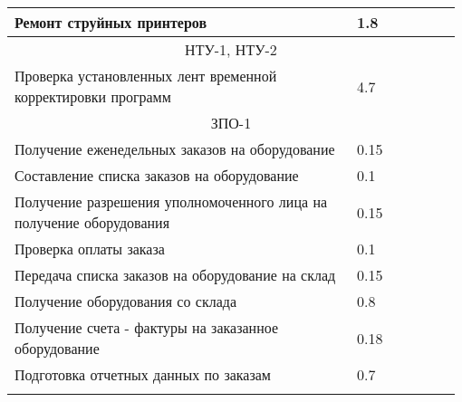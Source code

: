 \documentclass[a4paper,14pt]{extarticle}
\begin{document}
\begin{longtable}{|p{0.75\linewidth}|m{0.23\linewidth}|}
		Ремонт струйных принтеров  & 1.8 \\ \hline
		\multicolumn{ 2}{|c|}{НТУ-1, НТУ-2} \\ \hline
		Проверка установленных лент временной корректировки программ  & 4.7 \\ \hline
		\multicolumn{ 2}{|c|}{ЗПО-1} \\ \hline
		Получение еженедельных заказов на оборудование  & 0.15 \\ \hline
		Составление списка заказов на оборудование  & 0.1 \\ \hline
		Получение разрешения уполномоченного лица на получение оборудования  & 0.15 \\ \hline
		Проверка оплаты заказа  & 0.1 \\ \hline
		Передача списка заказов на оборудование на склад  & 0.15 \\ \hline
		Получение оборудования со склада  & 0.8 \\ \hline
		Получение счета - фактуры на заказанное оборудование  & 0.18 \\ \hline
		Подготовка отчетных данных по заказам  & 0.7 \\ \hline

		\label{tab:month}
	\end{longtable}

\normalsize
\end{document}
